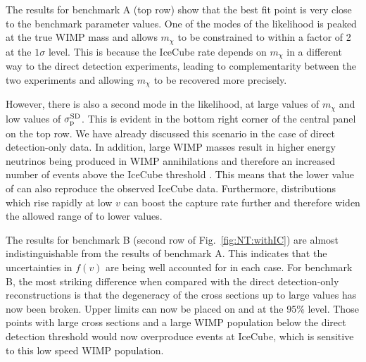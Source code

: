 The results for benchmark A (top row) show that the best fit point is very close to the benchmark parameter values. One of the modes of the likelihood is peaked at the true WIMP mass and allows $m_\chi$ to be constrained to within a factor of 2 at the $1\sigma$ level. This is because the IceCube rate depends on $m_\chi$ in a different way to the direct detection experiments, leading to complementarity between the two experiments and allowing $m_\chi$ to be recovered more precisely. 

However, there is also a second mode in the likelihood, at large values of $m_\chi$ and low values of $\sigmapsd$. This is evident in the bottom right corner of the central panel on the top row. We have already discussed this scenario in the case of direct detection-only data. In addition, large WIMP masses result in higher energy neutrinos being produced in WIMP annihilations and therefore an increased number of events above the IceCube threshold \cite{Arina:2013}. This means that the lower value of \sigmapsd can also reproduce the observed IceCube data. Furthermore, distributions which rise rapidly at low $v$ can boost the capture rate further and therefore widen the allowed range of \sigmapsd to lower values.

The results for benchmark B (second row of Fig.~\ref{fig:NT:withIC}) are almost indistinguishable from the results of benchmark A. This indicates that the uncertainties in $f(v)$ are being well accounted for in each case. For benchmark B, the most striking difference when compared with the direct detection-only reconstructions is that the degeneracy of the cross sections up to large values has now been broken. Upper limits can now be placed on \sigmapsi and \sigmapsd at the 95\% level. Those points with large cross sections and a large WIMP population below the direct detection threshold would now overproduce events at IceCube, which is sensitive to this low speed WIMP population.

